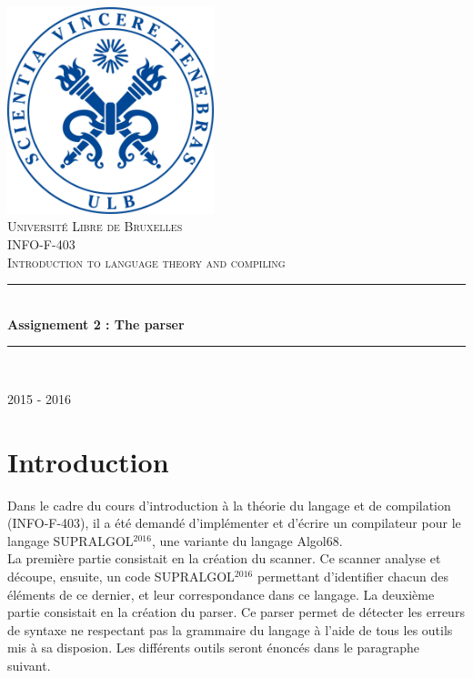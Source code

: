\documentclass[pdftex,10pt,a4paper]{article}
\newcommand{\HRule}{\rule{\linewidth}{0.5mm}}
\begin{document}
\begin{titlepage}
\begin{center}

\includegraphics[width=0.45\textwidth]{./sceau-a-quadri.jpg}\\[1cm]

\textsc{\LARGE Université Libre de Bruxelles}\\[1.5cm]
\textsc{\Large INFO-F-403\\ Introduction to language theory and compiling}\\[1.5cm]

\HRule \\[0.4cm]
{ \huge \bfseries Assignement 2 : The parser\\[0.4cm] }

\HRule \\[1.5cm]


\vfill
{\large 2015 - 2016}

\end{center}
\end{titlepage}

\newpage

\section{Introduction}

Dans le cadre du cours d'introduction à la théorie du langage et de compilation (INFO-F-403), il a été demandé d'implémenter et d'écrire un compilateur pour le langage SUPRALGOL$^{2016}$, une variante du langage Algol68.\\

La première partie consistait en la création du scanner. Ce scanner analyse et découpe, ensuite, un code SUPRALGOL$^{2016}$ permettant d'identifier chacun des éléments de ce dernier, et leur correspondance dans ce langage.
La deuxième partie consistait en la création du parser. Ce parser permet de détecter les erreurs de syntaxe ne respectant pas la grammaire du langage à l'aide de tous les outils mis à sa disposion. Les différents outils seront énoncés dans le paragraphe suivant. \\
\end{document}
